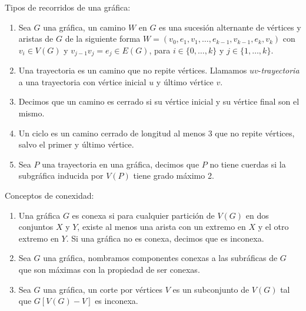 \begin{definicion} Tipos de recorridos de una gr\'afica:
    \label{def:tipos de recorridos}
    \begin{enumerate}
        \item Sea $G$ una gr\'afica, un camino $W$ en $G$ es una sucesi\'on
        alternante de v\'ertices y aristas de $G$ de la siguiente forma $W=(v_0,
        e_1,v_1, \dots, e_{k-1},v_{k-1}, e_k,v_k)$ con $v_i \in V(G)$ y
        $v_{j-1}v_j = e_j \in E(G)$, para $i \in \{0, \dots, k\}$ y $j \in \{ 1,
        \dots, k\}$.
        \item Una trayectoria es un camino que no repite v\'ertices. Llamamos
        $uv$-\textit{trayectoria} a una trayectoria con v\'ertice inicial $u$ y
        \'ultimo v\'ertice $v$.
        \item Decimos que un camino es cerrado si su v\'ertice inicial y su
        v\'ertice final son el mismo.
        \item Un ciclo es un camino cerrado de longitud al menos $3$ que no
        repite v\'ertices, salvo el primer y \'ultimo v\'ertice.
        \item Sea $P$ una trayectoria en una gr\'afica, decimos que $P$ no tiene
        cuerdas si la subgr\'afica inducida por $V(P)$ tiene grado m\'aximo 2.
    \end{enumerate}
\end{definicion}

\begin{definicion} Conceptos de conexidad:
    \label{def:conexidad}
    \begin{enumerate}    
        \item Una gr\'afica $G$ es conexa si para cualquier partici\'on de
        $V(G)$ en dos conjuntos $X$ y $Y$, existe al menos una arista con un
        extremo en $X$ y el otro extremo en $Y$. Si una gr\'afica no es conexa,
        decimos que es inconexa.
        \item Sea $G$ una gr\'afica, nombramos componentes conexas a las
        subr\'aficas de $G$ que son m\'aximas con la propiedad de ser conexas.
        \item Sea $G$ una gr\'afica, un corte por v\'ertices $V$ es un
        subconjunto de $V(G)$ tal que $G[V(G)-V]$ es inconexa.
    \end{enumerate}
\end{definicion}

